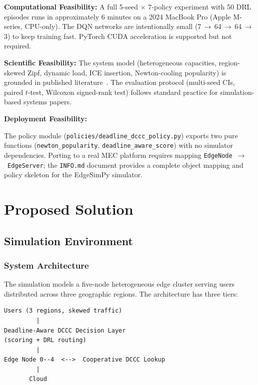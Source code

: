\documentclass[12pt,a4paper]{report}
\begin{document}
\textbf{Computational Feasibility:}
A full 5-seed $\times$ 7-policy experiment with 50 DRL episodes runs in approximately
6 minutes on a 2024 MacBook Pro (Apple M-series, CPU-only). The DQN networks are
intentionally small (7\,$\to$\,64\,$\to$\,64\,$\to$\,3) to keep training fast. PyTorch CUDA
acceleration is supported but not required.

\textbf{Scientific Feasibility:}
The system model (heterogeneous capacities, region-skewed Zipf, dynamic load, ICE
insertion, Newton-cooling popularity) is grounded in published literature~\cite{ref1,ref2,ref6}.
The evaluation protocol (multi-seed CIs, paired $t$-test, Wilcoxon signed-rank test) follows
standard practice for simulation-based systems papers.

\textbf{Deployment Feasibility:}
{\sloppy The policy module (\texttt{policies/deadline\_dccc\_policy.py}) exports two pure
functions (\texttt{newton\_popularity}, \texttt{deadline\_aware\_score}) with no simulator
dependencies. Porting to a real MEC platform requires mapping
\texttt{EdgeNode}~$\to$~\texttt{EdgeServer}; the \texttt{INFO.md} document provides a
complete object mapping and policy skeleton for the EdgeSimPy simulator.\par}

\clearpage


\chapter{Proposed Solution}
\label{ch:solution}

\section{Simulation Environment}

\subsection{System Architecture}

The simulation models a five-node heterogeneous edge cluster serving users distributed
across three geographic regions. The architecture has three tiers:

\begin{lstlisting}[caption={System Tier Architecture},label={lst:arch}]
Users (3 regions, skewed traffic)
         |
Deadline-Aware DCCC Decision Layer
(scoring + DRL routing)
         |
Edge Node 0--4  <-->  Cooperative DCCC Lookup
         |
       Cloud
\end{lstlisting}
\end{document}
